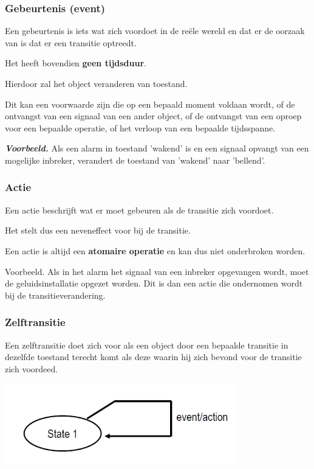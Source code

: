 \subsubsection{Gebeurtenis (event)}

Een gebeurtenis is iets wat zich voordoet in de reële wereld en dat er de oorzaak van is dat er een transitie optreedt. 

Het heeft bovendien \textbf{geen tijdsduur}.

Hierdoor zal het object veranderen van toestand. 

Dit kan een voorwaarde zijn die op een bepaald moment voldaan wordt, of de ontvangst van een signaal van een ander object, of de ontvangst van een oproep voor een bepaalde operatie, of het verloop van een bepaalde tijdsspanne.

\textit{\textbf{Voorbeeld.}} Als een alarm in toestand 'wakend' is en een signaal opvangt van een mogelijke inbreker, verandert de toestand van 'wakend' naar 'bellend'.

\subsubsection{Actie}

Een actie beschrijft wat er moet gebeuren als de transitie zich voordoet. 

Het stelt dus een neveneffect voor bij de transitie. 

Een actie is altijd een \textbf{atomaire operatie} en kan dus niet onderbroken worden.

Voorbeeld. Als in het alarm het signaal van een inbreker opgevangen wordt, moet de geluidsinstallatie opgezet worden. Dit is dan een actie die ondernomen wordt bij de transitieverandering.
\newpage
\subsubsection{Zelftransitie}

Een zelftransitie doet zich voor als een object door een bepaalde transitie in dezelfde toestand terecht komt als deze waarin hij zich bevond voor de transitie zich voordeed.


\begin{center}
\includegraphics[width=4in]{img/state4}%
\end{center}

